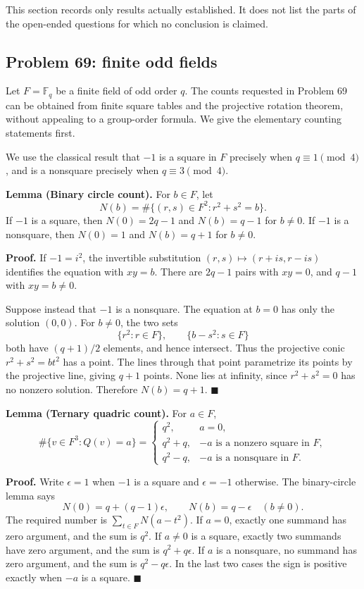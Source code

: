 \documentclass[11pt]{article}
\newcommand{\F}{\mathbb F}
\begin{document}
This section records only results actually established.  It does not list the
parts of the open-ended questions for which no conclusion is claimed.

\subsection{Problem 69: finite odd fields}

Let \(F=\F_q\) be a finite field of odd order \(q\).  The counts requested in
Problem 69 can be obtained from finite square tables and the projective
rotation theorem, without appealing to a group-order formula.  We give the
elementary counting statements first.

We use the classical result that \(-1\) is a square in \(F\) precisely when
\(q\equiv1\pmod4\), and is a nonsquare precisely when
\(q\equiv3\pmod4\).

\medskip
\noindent\textbf{Lemma (Binary circle count).}
For \(b\in F\), let
\[
 N(b)=\#\{(r,s)\in F^2:r^2+s^2=b\}.
\]
If \(-1\) is a square, then \(N(0)=2q-1\) and \(N(b)=q-1\) for
\(b\ne0\).  If \(-1\) is a nonsquare, then \(N(0)=1\) and \(N(b)=q+1\)
for \(b\ne0\).

\smallskip
\noindent\textbf{Proof.}
If \(-1=i^2\), the invertible substitution
\((r,s)\mapsto(r+is,r-is)\) identifies the equation with \(xy=b\).  There
are \(2q-1\) pairs with \(xy=0\), and \(q-1\) with \(xy=b\ne0\).

Suppose instead that \(-1\) is a nonsquare.  The equation at \(b=0\) has
only the solution \((0,0)\).  For \(b\ne0\), the two sets
\[
 \{r^2:r\in F\},\qquad \{b-s^2:s\in F\}
\]
both have \((q+1)/2\) elements, and hence intersect.  Thus the projective
conic \(r^2+s^2=bt^2\) has a point.  The lines through that point
parametrize its points by the projective line, giving \(q+1\) points.  None
lies at infinity, since \(r^2+s^2=0\) has no nonzero solution.  Therefore
\(N(b)=q+1\). \hfill\(\blacksquare\)

\medskip
\noindent\textbf{Lemma (Ternary quadric count).}
For \(a\in F\),
\[
 \#\{v\in F^3:Q(v)=a\}=
 \begin{cases}
 q^2,&a=0,\\
 q^2+q,&-a\text{ is a nonzero square in }F,\\
 q^2-q,&-a\text{ is a nonsquare in }F.
 \end{cases}
\]

\smallskip
\noindent\textbf{Proof.}
Write \(\epsilon=1\) when \(-1\) is a square and \(\epsilon=-1\) otherwise.
The binary-circle lemma says
\[
 N(0)=q+(q-1)\epsilon,
 \qquad N(b)=q-\epsilon\quad(b\ne0).
\]
The required number is \(\sum_{t\in F}N(a-t^2)\).  If \(a=0\), exactly one
summand has zero argument, and the sum is \(q^2\).  If \(a\ne0\) is a square,
exactly two summands have zero argument, and the sum is \(q^2+q\epsilon\).
If \(a\) is a nonsquare, no summand has zero argument, and the sum is
\(q^2-q\epsilon\).  In the last two cases the sign is positive exactly when
\(-a\) is a square. \hfill\(\blacksquare\)
\end{document}
